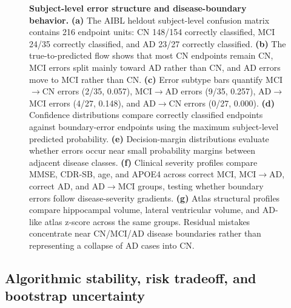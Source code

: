 \begin{figure}[p]
    \centering
    \caption{\textbf{Subject-level error structure and disease-boundary behavior.} \textbf{(a)} The AIBL heldout subject-level confusion matrix contains 216 endpoint units: CN 148/154 correctly classified, MCI 24/35 correctly classified, and AD 23/27 correctly classified. \textbf{(b)} The true-to-predicted flow shows that most CN endpoints remain CN, MCI errors split mainly toward AD rather than CN, and AD errors move to MCI rather than CN. \textbf{(c)} Error subtype bars quantify MCI$\rightarrow$CN errors (2/35, 0.057), MCI$\rightarrow$AD errors (9/35, 0.257), AD$\rightarrow$MCI errors (4/27, 0.148), and AD$\rightarrow$CN errors (0/27, 0.000). \textbf{(d)} Confidence distributions compare correctly classified endpoints against boundary-error endpoints using the maximum subject-level predicted probability. \textbf{(e)} Decision-margin distributions evaluate whether errors occur near small probability margins between adjacent disease classes. \textbf{(f)} Clinical severity profiles compare MMSE, CDR-SB, age, and APOE4 across correct MCI, MCI$\rightarrow$AD, correct AD, and AD$\rightarrow$MCI groups, testing whether boundary errors follow disease-severity gradients. \textbf{(g)} Atlas structural profiles compare hippocampal volume, lateral ventricular volume, and AD-like atlas z-score across the same groups. Residual mistakes concentrate near CN/MCI/AD disease boundaries rather than representing a collapse of AD cases into CN.}
    \label{fig:v6_error}
\end{figure}

\subsection{Algorithmic stability, risk tradeoff, and bootstrap uncertainty}
\label{sec:stability}

